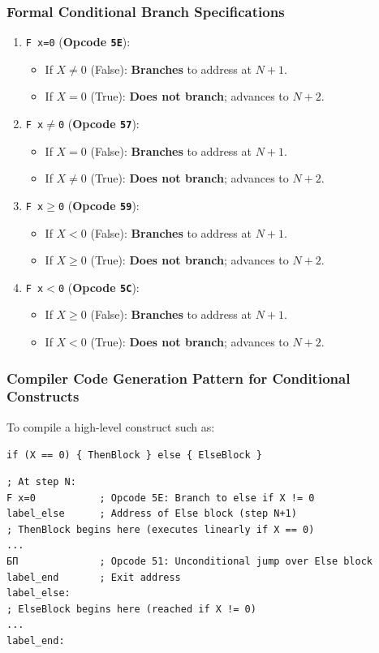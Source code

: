 \documentclass[11pt,a4paper]{article}
\begin{document}
\subsubsection{Formal Conditional Branch Specifications}
\begin{enumerate}
    \item \texttt{F x=0} (\textbf{Opcode \texttt{5E}}):
    \begin{itemize}
        \item If $X \ne 0$ (False): \textbf{Branches} to address at $N+1$.
        \item If $X = 0$ (True): \textbf{Does not branch}; advances to $N+2$.
    \end{itemize}
    \item \texttt{F x$\ne$0} (\textbf{Opcode \texttt{57}}):
    \begin{itemize}
        \item If $X = 0$ (False): \textbf{Branches} to address at $N+1$.
        \item If $X \ne 0$ (True): \textbf{Does not branch}; advances to $N+2$.
    \end{itemize}
    \item \texttt{F x$\ge$0} (\textbf{Opcode \texttt{59}}):
    \begin{itemize}
        \item If $X < 0$ (False): \textbf{Branches} to address at $N+1$.
        \item If $X \ge 0$ (True): \textbf{Does not branch}; advances to $N+2$.
    \end{itemize}
    \item \texttt{F x$<$0} (\textbf{Opcode \texttt{5C}}):
    \begin{itemize}
        \item If $X \ge 0$ (False): \textbf{Branches} to address at $N+1$.
        \item If $X < 0$ (True): \textbf{Does not branch}; advances to $N+2$.
    \end{itemize}
\end{enumerate}

\subsubsection{Compiler Code Generation Pattern for Conditional Constructs}
To compile a high-level construct such as:
\begin{center}
\texttt{if (X == 0) \{ ThenBlock \} else \{ ElseBlock \}}
\end{center}
\begin{center}
\begin{tcolorbox}[colback=codebg,colframe=darkslate,width=0.95\textwidth]
\begin{verbatim}
; At step N:
F x=0           ; Opcode 5E: Branch to else if X != 0
label_else      ; Address of Else block (step N+1)
; ThenBlock begins here (executes linearly if X == 0)
...
БП              ; Opcode 51: Unconditional jump over Else block
label_end       ; Exit address
label_else:
; ElseBlock begins here (reached if X != 0)
...
label_end:
\end{verbatim}
\end{tcolorbox}
\end{center}
\end{document}
